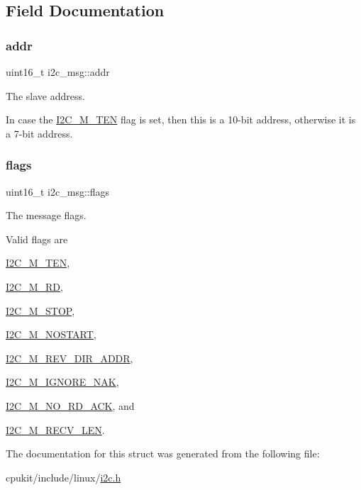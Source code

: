 \subsection{Field Documentation}
\mbox{\label{structi2c__msg_aeef06bd01ffe9f348987c253d11ba721}} 
\subsubsection{\texorpdfstring{addr}{addr}}
{\footnotesize\ttfamily uint16\+\_\+t i2c\+\_\+msg\+::addr}



The slave address. 

In case the \mbox{\hyperlink{group__I2CLinux_gabe53ff15e0717ccbd1d4c656c09ee53a}{I2\+C\+\_\+\+M\+\_\+\+T\+EN}} flag is set, then this is a 10-\/bit address, otherwise it is a 7-\/bit address. \mbox{\label{structi2c__msg_a8633f67b7fb7d6e4b4389d8a5b999e5f}} 
\subsubsection{\texorpdfstring{flags}{flags}}
{\footnotesize\ttfamily uint16\+\_\+t i2c\+\_\+msg\+::flags}



The message flags. 

Valid flags are
\begin{DoxyItemize}
\item \mbox{\hyperlink{group__I2CLinux_gabe53ff15e0717ccbd1d4c656c09ee53a}{I2\+C\+\_\+\+M\+\_\+\+T\+EN}},
\item \mbox{\hyperlink{group__I2CLinux_gadb8eddbb89e88c4fc0e44306fc878b85}{I2\+C\+\_\+\+M\+\_\+\+RD}},
\item \mbox{\hyperlink{group__I2CLinux_gaf8026e2132312a148edbe7ff4ce52a72}{I2\+C\+\_\+\+M\+\_\+\+S\+T\+OP}},
\item \mbox{\hyperlink{group__I2CLinux_ga7a467d37a113d97496f0fa69c6c15650}{I2\+C\+\_\+\+M\+\_\+\+N\+O\+S\+T\+A\+RT}},
\item \mbox{\hyperlink{group__I2CLinux_ga6392dd65e4022a3ed20fc2d7dca3392f}{I2\+C\+\_\+\+M\+\_\+\+R\+E\+V\+\_\+\+D\+I\+R\+\_\+\+A\+D\+DR}},
\item \mbox{\hyperlink{group__I2CLinux_ga0629c50bb05b4c037e726373da50755b}{I2\+C\+\_\+\+M\+\_\+\+I\+G\+N\+O\+R\+E\+\_\+\+N\+AK}},
\item \mbox{\hyperlink{group__I2CLinux_gadb8351c5c02ca2b6909baa9d374ff6d4}{I2\+C\+\_\+\+M\+\_\+\+N\+O\+\_\+\+R\+D\+\_\+\+A\+CK}}, and
\item \mbox{\hyperlink{group__I2CLinux_gad1b3262018276534d433daaf96648480}{I2\+C\+\_\+\+M\+\_\+\+R\+E\+C\+V\+\_\+\+L\+EN}}. 
\end{DoxyItemize}

The documentation for this struct was generated from the following file\+:\begin{DoxyCompactItemize}
\item 
cpukit/include/linux/\mbox{\hyperlink{cpukit_2include_2linux_2i2c_8h}{i2c.\+h}}\end{DoxyCompactItemize}
